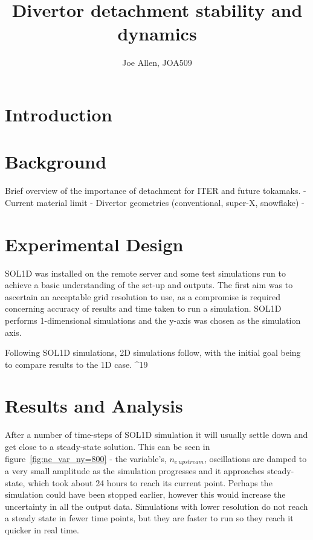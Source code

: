 \documentclass[11pt, twocolumn]{article}  %
\providecommand{\neupstream}{$n_{e~upstream}$} %
\begin{document}
\title{Divertor detachment stability and dynamics}
\author{Joe Allen, JOA509}



\section{Introduction}\label{sec:Intro}

\section{Background}\label{sec:Bg}
Brief overview of the importance of detachment for ITER and future tokamaks.
- Current material limit
- Divertor geometries (conventional, super-X, snowflake)
- 


\section{Experimental Design}\label{sec:Expt}
SOL1D was installed on the remote server and some test simulations run to achieve a basic understanding of the set-up and outputs. The first aim was to ascertain an acceptable grid resolution to use, as a compromise is required concerning accuracy of results and time taken to run a simulation. SOL1D performs 1-dimensional simulations and the y-axis was chosen as the simulation axis. 

Following SOL1D simulations, 2D simulations follow, with the initial goal being to compare results to the 1D case.
^{19}

\section{Results and Analysis}\label{sec:Results}
After a number of time-steps of SOL1D simulation it will usually settle down and get close to a steady-state solution. This can be seen in figure~\ref{fig:ne_var_ny=800} - the variable's, \neupstream, oscillations are damped to a very small amplitude as the simulation progresses and it approaches steady-state, which took about 24 hours to reach its current point. Perhaps the simulation could have been stopped earlier, however this would increase the uncertainty in all the output data. Simulations with lower resolution do not reach a steady state in fewer time points, but they are faster to run so they reach it quicker in real time.
\end{document}
